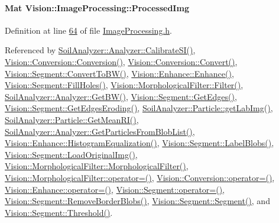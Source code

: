 \hypertarget{class_vision_1_1_image_processing_aa7d65742882cd1b2a1e4e9cb68809211}{}
\paragraph[{Processed\+Img}]{\setlength{\rightskip}{0pt plus 5cm}Mat Vision\+::\+Image\+Processing\+::\+Processed\+Img}\label{class_vision_1_1_image_processing_aa7d65742882cd1b2a1e4e9cb68809211}


Definition at line \hyperlink{_image_processing_8h_source_l00064}{64} of file \hyperlink{_image_processing_8h_source}{Image\+Processing.\+h}.



Referenced by \hyperlink{analyzer_8cpp_source_l00388}{Soil\+Analyzer\+::\+Analyzer\+::\+Calibrate\+S\+I()}, \hyperlink{_conversion_8cpp_source_l00029}{Vision\+::\+Conversion\+::\+Conversion()}, \hyperlink{_conversion_8cpp_source_l00066}{Vision\+::\+Conversion\+::\+Convert()}, \hyperlink{_segment_8cpp_source_l00153}{Vision\+::\+Segment\+::\+Convert\+To\+B\+W()}, \hyperlink{_enhance_8cpp_source_l00020}{Vision\+::\+Enhance\+::\+Enhance()}, \hyperlink{_segment_8cpp_source_l00615}{Vision\+::\+Segment\+::\+Fill\+Holes()}, \hyperlink{_morphological_filter_8cpp_source_l00089}{Vision\+::\+Morphological\+Filter\+::\+Filter()}, \hyperlink{analyzer_8cpp_source_l00236}{Soil\+Analyzer\+::\+Analyzer\+::\+Get\+B\+W()}, \hyperlink{_segment_8cpp_source_l00389}{Vision\+::\+Segment\+::\+Get\+Edges()}, \hyperlink{_segment_8cpp_source_l00483}{Vision\+::\+Segment\+::\+Get\+Edges\+Eroding()}, \hyperlink{particle_8cpp_source_l00138}{Soil\+Analyzer\+::\+Particle\+::get\+Lab\+Img()}, \hyperlink{particle_8cpp_source_l00120}{Soil\+Analyzer\+::\+Particle\+::\+Get\+Mean\+R\+I()}, \hyperlink{analyzer_8cpp_source_l00322}{Soil\+Analyzer\+::\+Analyzer\+::\+Get\+Particles\+From\+Blob\+List()}, \hyperlink{_enhance_8cpp_source_l00277}{Vision\+::\+Enhance\+::\+Histogram\+Equalization()}, \hyperlink{_segment_8cpp_source_l00316}{Vision\+::\+Segment\+::\+Label\+Blobs()}, \hyperlink{_segment_8cpp_source_l00056}{Vision\+::\+Segment\+::\+Load\+Original\+Img()}, \hyperlink{_morphological_filter_8cpp_source_l00032}{Vision\+::\+Morphological\+Filter\+::\+Morphological\+Filter()}, \hyperlink{_morphological_filter_8cpp_source_l00062}{Vision\+::\+Morphological\+Filter\+::operator=()}, \hyperlink{_conversion_8cpp_source_l00041}{Vision\+::\+Conversion\+::operator=()}, \hyperlink{_enhance_8cpp_source_l00062}{Vision\+::\+Enhance\+::operator=()}, \hyperlink{_segment_8cpp_source_l00041}{Vision\+::\+Segment\+::operator=()}, \hyperlink{_segment_8cpp_source_l00245}{Vision\+::\+Segment\+::\+Remove\+Border\+Blobs()}, \hyperlink{_segment_8cpp_source_l00020}{Vision\+::\+Segment\+::\+Segment()}, and \hyperlink{_segment_8cpp_source_l00176}{Vision\+::\+Segment\+::\+Threshold()}.

